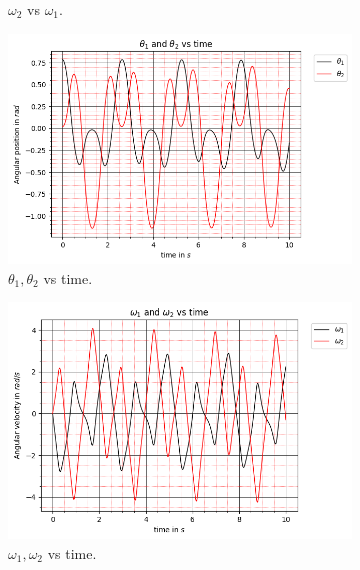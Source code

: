 \begin{figure}[H]
\begin{subfigure}[b]{0.49\textwidth}
        \caption{$\omega_2$ vs $\omega_1$.}
        \label{fig:3b}
    \end{subfigure}
    \hfill
    \begin{subfigure}[b]{0.49\textwidth}
        \centering
        \includegraphics[width=\textwidth]{figures/initial-conditions-b/Angular Positions vs Time.png}
        \caption{$\theta_1, \theta_2$ vs time.}
        \label{fig:3c}
    \end{subfigure}
    \hfill
    \begin{subfigure}[b]{0.49\textwidth}
        \centering
        \includegraphics[width=\textwidth]{figures/initial-conditions-b/Angular Velocities vs Time.png}
        \caption{$\omega_1, \omega_2$ vs time.}
        \label{fig:3d}
    \end{subfigure}
    \hfill
    \begin{subfigure}[b]{0.49\textwidth}

\end{subfigure}
\end{figure}
